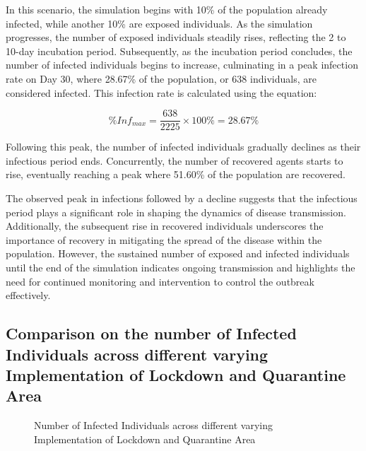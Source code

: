 In this scenario, the simulation begins with 10\% of the population already infected, while another 10\% are exposed individuals. As the simulation progresses, the number of exposed individuals steadily rises, reflecting the 2 to 10-day incubation period. Subsequently, as the incubation period concludes, the number of infected individuals begins to increase, culminating in a peak infection rate on Day 30, where 28.67\% of the population, or 638 individuals, are considered infected. This infection rate is calculated using the equation:

\[ \%Inf_{max} = \frac{638}{2225} \times 100\%  = 28.67\%\]

Following this peak, the number of infected individuals gradually declines as their infectious period ends. Concurrently, the number of recovered agents starts to rise, eventually reaching a peak where 51.60\% of the population are recovered.

The observed peak in infections followed by a decline suggests that the infectious period plays a significant role in shaping the dynamics of disease transmission. Additionally, the subsequent rise in recovered individuals underscores the importance of recovery in mitigating the spread of the disease within the population. However, the sustained number of exposed and infected individuals until the end of the simulation indicates ongoing transmission and highlights the need for continued monitoring and intervention to control the outbreak effectively.
\subsection{ Comparison on the number of Infected Individuals across different varying Implementation of Lockdown and Quarantine Area}

\begin{figure}[H]
	\centering
	\quad
	\quad
	
	\caption{Number of Infected Individuals across different varying Implementation of Lockdown and Quarantine Area}
	\label{QLD}
\end{figure}


